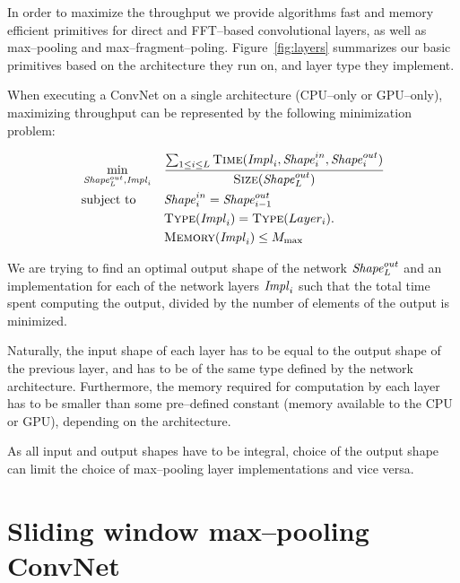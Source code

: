 \documentclass[conference]{IEEEtran}
\begin{document}
  In order to maximize the throughput we provide algorithms fast and
  memory efficient primitives for direct and FFT--based convolutional
  layers, as well as max--pooling and max--fragment--poling.
  Figure~\ref{fig:layers} summarizes our basic primitives based on the
  architecture they run on, and layer type they implement.

  When executing a ConvNet on a single architecture (CPU--only or
  GPU--only), maximizing throughput can be represented by the
  following minimization problem:

  \begin{equation*}
    \begin{aligned}
      & \min_{\id{Shape}^{out}_L, \id{Impl}_i}
      & & \frac{\sum_{1 \le i \le L} \proc{Time}(\id{Impl}_i,\id{Shape}^{in}_i,\id{Shape}^{out}_i)}
      { \proc{Size}( \id{Shape}^{out}_L)} \\
      & \textrm{subject to} & &
      \id{Shape}^{in}_i = \id{Shape}^{out}_{i-1} \\
      & & &
      \proc{Type}(\id{Impl}_i) = \proc{Type}(Layer_i). \\
      & & &
      \proc{Memory}(\id{Impl}_i) \le M_{\max} \\
    \end{aligned}
  \end{equation*}

  We are trying to find an optimal output shape of the network
  $\id{Shape}^{out}_L$ and an implementation for each of the network
  layers $\id{Impl}_i$ such that the total time spent computing the
  output, divided by the number of elements of the output is
  minimized.

  Naturally, the input shape of each layer has to be equal to the
  output shape of the previous layer, and has to be of the same type
  defined by the network architecture.  Furthermore, the memory
  required for computation by each layer has to be smaller than some
  pre--defined constant (memory available to the CPU or GPU),
  depending on the architecture.

  As all input and output shapes have to be integral, choice of the
  output shape can limit the choice of max--pooling layer
  implementations and vice versa.

\section{Sliding window max--pooling ConvNet}

  \label{sec:sliding-window}
\end{document}
